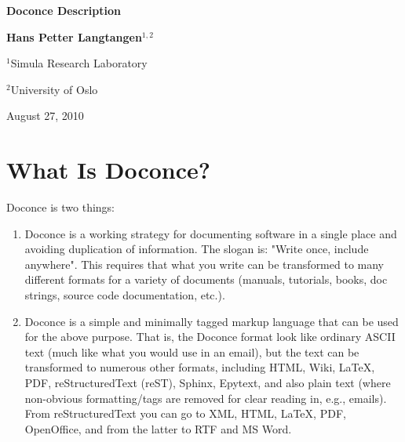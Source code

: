 \documentclass{article}
\begin{document}





\begin{center}
{\LARGE\bf Doconce Description}
\end{center}



\begin{center}
{\bf Hans Petter Langtangen${}^{1, 2}$} \\ [0mm]
\end{center}

\begin{center}
{\small ${}^1$Simula Research Laboratory} \\ [-1.0mm]
\end{center}

\begin{center}
{\small ${}^2$University of Oslo} \\ [-1.0mm]
\end{center}





\begin{center}
August 27, 2010
\end{center}




\section{What Is Doconce?}

\label{what:is:doconce}

Doconce is two things:

\begin{enumerate}
 \item Doconce is a working strategy for documenting software in a single
    place and avoiding duplication of information. The slogan is:
    "Write once, include anywhere". This requires that what you write
    can be transformed to many different formats for a variety of
    documents (manuals, tutorials, books, doc strings, source code
    documentation, etc.).

 \item Doconce is a simple and minimally tagged markup language that can
    be used for the above purpose. That is, the Doconce format look
    like ordinary ASCII text (much like what you would use in an
    email), but the text can be transformed to numerous other formats,
    including HTML, Wiki, {\LaTeX}, PDF, reStructuredText (reST), Sphinx,
    Epytext, and also plain text (where non-obvious formatting/tags are
    removed for clear reading in, e.g., emails). From reStructuredText
    you can go to XML, HTML, {\LaTeX}, PDF, OpenOffice, and from the
    latter to RTF and MS Word.
\end{enumerate}
\end{document}
